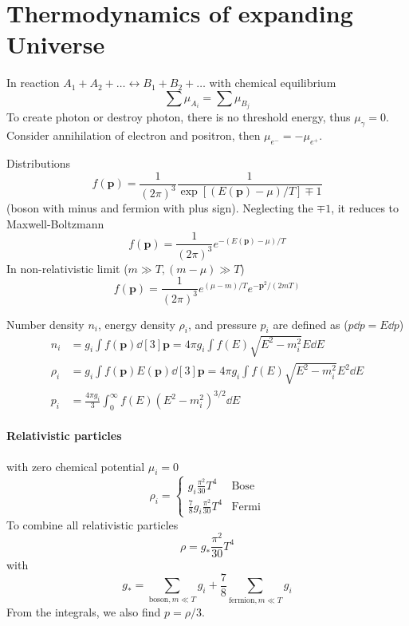 \documentclass[12pt, a4paper, DIV=15]{article}
\numberwithin{equation}{section}
\begin{document}
\section{Thermodynamics of expanding Universe}
In reaction $A_1 + A_2 + \dots \leftrightarrow B_1 + B_2 + \dots$ with chemical equilibrium
\begin{equation}
   \sum \mu_{A_i} = \sum \mu_{B_j}
\end{equation}
To create photon or destroy photon, there is no threshold energy, thus $\mu_\gamma = 0$. Consider annihilation of electron and positron, then $\mu_{e^-} = - \mu_{e^+}$.

Distributions
\begin{equation}
   f(\pmb{p}) = \frac{1}{(2\pi)^3} \frac{1}{\exp[(E(\pmb{p})-\mu)/T]  \mp 1} \label{dist}
\end{equation}
(boson with minus and fermion with plus sign). Neglecting the $\mp 1$, it reduces to Maxwell-Boltzmann 
\begin{equation}
   f(\pmb{p}) = \frac{1}{(2\pi)^3} e^{-(E(\pmb{p})-\mu)/T}
\end{equation}
In non-relativistic limit ($m \gg T, (m - \mu) \gg T$)
\begin{equation}
   f(\pmb{p}) = \frac{1}{(2\pi)^3} e^{(\mu - m)/T} e^{- \pmb{p}^2/(2mT)}
\end{equation}

Number density $n_i$, energy density $\rho_i$, and pressure $p_i$ are defined as ($p\dd{p} = E \dd{p}$)
\begin{align}
   n_i &= g_i \int f(\pmb{p}) \dd[3]{\pmb{p}} = 4\pi g_i \int f(E) \sqrt{E^2 - m_i^2} E \dd{E} \\
   \rho_i &= g_i \int f(\pmb{p}) E(\pmb{p}) \dd[3]{\pmb{p}} = 4\pi g_i \int f(E) \sqrt{E^2 - m_i^2} E^2 \dd{E} \\
   p_i &= \frac{4\pi g_i}{3} \int^\infty_0 f(E) (E^2 - m_i^2)^{3/2} \dd{E}
\end{align}

\paragraph{Relativistic particles} with zero chemical potential $\mu_i = 0$
\begin{equation}
   \rho_i = 
   \begin{cases}
      g_i \frac{\pi^2}{30} T^4 & \text{Bose} \\
      \frac{7}{8} g_i \frac{\pi^2}{30} T^4 & \text{Fermi}
   \end{cases}
\end{equation}
To combine all relativistic particles
\begin{equation}
   \rho = g_* \frac{\pi^2}{30} T^4
\end{equation}
with
\begin{equation}
   g_* = \sum_{\text{boson}, m \ll T} g_i + \frac{7}{8} \sum_{\text{fermion}, m \ll T} g_i
\end{equation}
From the integrals, we also find $p = \rho / 3$.
\end{document}

